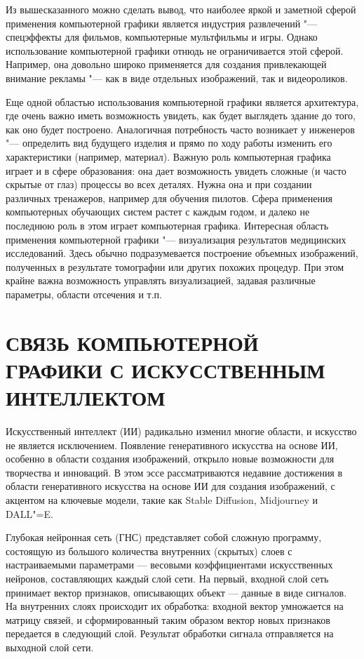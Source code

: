 \documentclass[referat]{SCWorks}
\begin{document}
Из вышесказанного можно сделать вывод, что наиболее яркой и заметной сферой применения компьютерной графики является индустрия развлечений "--- спецэффекты для фильмов, компьютерные мультфильмы и игры. Однако использование компьютерной графики отнюдь не ограничивается этой сферой. Например, она довольно широко применяется для создания привлекающей внимание рекламы "--- как в виде отдельных изображений, так и видеороликов.

Еще одной областью использования компьютерной графики является архитектура, где очень важно иметь возможность увидеть, как будет выглядеть здание до того, как оно будет построено. Аналогичная потребность часто возникает у инженеров "--- определить вид будущего изделия и прямо по ходу работы изменить его характеристики (например, материал). Важную роль компьютерная графика играет и в сфере образования: она дает возможность увидеть сложные (и часто скрытые от глаз) процессы во всех деталях. Нужна она и при создании различных тренажеров, например для обучения пилотов. Сфера применения компьютерных обучающих систем растет с каждым годом, и далеко не последнюю роль в этом играет компьютерная графика. Интересная область применения компьютерной графики "--- визуализация результатов медицинских исследований. Здесь обычно подразумевается построение объемных изображений, полученных в результате томографии или других похожих процедур. При этом крайне важна возможность управлять визуализацией, задавая различные параметры, области отсечения и т.п.\cite{Boreskov2017}

\section{СВЯЗЬ КОМПЬЮТЕРНОЙ ГРАФИКИ С ИСКУССТВЕННЫМ ИНТЕЛЛЕКТОМ}
Искусственный интеллект (ИИ) радикально изменил многие области, и искусство не является исключением. Появление генеративного искусства на основе ИИ, особенно в области создания изображений, открыло новые возможности для творчества и инноваций. В этом эссе рассматриваются недавние достижения в области генеративного искусства на основе ИИ для создания изображений, с акцентом на ключевые модели, такие как Stable Diffusion, Midjourney и DALL"=E.

Глубокая нейронная сеть (ГНС) представляет собой сложную программу, состоящую из большого количества внутренних (скрытых) слоев с настраиваемыми параметрами — весовыми коэффициентами искусственных нейронов, составляющих каждый слой сети. На первый, входной слой сеть принимает вектор признаков, описывающих объект — данные в виде сигналов. На внутренних слоях происходит их обработка: входной вектор умножается на матрицу связей, и сформированный таким образом вектор новых признаков передается в следующий слой. Результат обработки сигнала отправляется на выходной слой сети\cite{PostScience}.
\end{document}
